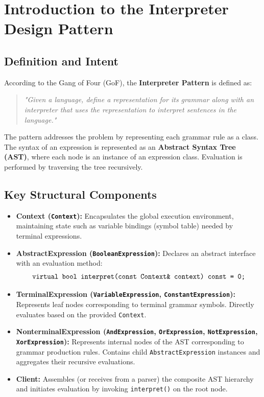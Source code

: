 \documentclass[12pt,a4paper]{article}
\begin{document}
\section{Introduction to the Interpreter Design Pattern}

\subsection{Definition and Intent}
According to the Gang of Four (GoF), the \textbf{Interpreter Pattern} is defined as:
\begin{quote}
\textit{"Given a language, define a representation for its grammar along with an interpreter that uses the representation to interpret sentences in the language."}
\end{quote}

The pattern addresses the problem by representing each grammar rule as a class. The syntax of an expression is represented as an \textbf{Abstract Syntax Tree (AST)}, where each node is an instance of an expression class. Evaluation is performed by traversing the tree recursively.

\subsection{Key Structural Components}
\begin{itemize}
    \item \textbf{Context (\texttt{Context}):} Encapsulates the global execution environment, maintaining state such as variable bindings (symbol table) needed by terminal expressions.
    \item \textbf{AbstractExpression (\texttt{BooleanExpression}):} Declares an abstract interface with an evaluation method:
    \begin{equation*}
        \text{\texttt{virtual bool interpret(const Context\& context) const = 0;}}
    \end{equation*}
    \item \textbf{TerminalExpression (\texttt{VariableExpression}, \texttt{ConstantExpression}):} Represents leaf nodes corresponding to terminal grammar symbols. Directly evaluates based on the provided \texttt{Context}.
    \item \textbf{NonterminalExpression (\texttt{AndExpression}, \texttt{OrExpression}, \texttt{NotExpression}, \texttt{XorExpression}):} Represents internal nodes of the AST corresponding to grammar production rules. Contains child \texttt{AbstractExpression} instances and aggregates their recursive evaluations.
    \item \textbf{Client:} Assembles (or receives from a parser) the composite AST hierarchy and initiates evaluation by invoking \texttt{interpret()} on the root node.
\end{itemize}
\end{document}
